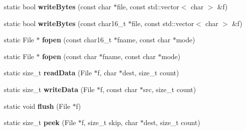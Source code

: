 \begin{DoxyCompactItemize}
\item 
\hypertarget{class_tempest_1_1_system_a_p_i_a67eec7d2f46346188cd33fa28ce6f58e}{static bool {\bfseries write\+Bytes} (const char $\ast$file, const std\+::vector$<$ char $>$ \&f)}\label{class_tempest_1_1_system_a_p_i_a67eec7d2f46346188cd33fa28ce6f58e}

\item 
\hypertarget{class_tempest_1_1_system_a_p_i_a15f47a03614f907f1b3bd8a5296af7d2}{static bool {\bfseries write\+Bytes} (const char16\+\_\+t $\ast$file, const std\+::vector$<$ char $>$ \&f)}\label{class_tempest_1_1_system_a_p_i_a15f47a03614f907f1b3bd8a5296af7d2}

\item 
\hypertarget{class_tempest_1_1_system_a_p_i_ab9aa33f6994e10db708417d124935c45}{static File $\ast$ {\bfseries fopen} (const char16\+\_\+t $\ast$fname, const char $\ast$mode)}\label{class_tempest_1_1_system_a_p_i_ab9aa33f6994e10db708417d124935c45}

\item 
\hypertarget{class_tempest_1_1_system_a_p_i_acce668a0f6bb48d2639d5726f4d12e5d}{static File $\ast$ {\bfseries fopen} (const char $\ast$fname, const char $\ast$mode)}\label{class_tempest_1_1_system_a_p_i_acce668a0f6bb48d2639d5726f4d12e5d}

\item 
\hypertarget{class_tempest_1_1_system_a_p_i_a4230f4d5fb605442a27b4d2ede77312e}{static size\+\_\+t {\bfseries read\+Data} (File $\ast$f, char $\ast$dest, size\+\_\+t count)}\label{class_tempest_1_1_system_a_p_i_a4230f4d5fb605442a27b4d2ede77312e}

\item 
\hypertarget{class_tempest_1_1_system_a_p_i_a9aae7541d4729af173139152756b7a29}{static size\+\_\+t {\bfseries write\+Data} (File $\ast$f, const char $\ast$src, size\+\_\+t count)}\label{class_tempest_1_1_system_a_p_i_a9aae7541d4729af173139152756b7a29}

\item 
\hypertarget{class_tempest_1_1_system_a_p_i_a9d81823b7d5c66ace6b5a16dc7b278a2}{static void {\bfseries flush} (File $\ast$f)}\label{class_tempest_1_1_system_a_p_i_a9d81823b7d5c66ace6b5a16dc7b278a2}

\item 
\hypertarget{class_tempest_1_1_system_a_p_i_a18f6e8af1cb2e6a7aa61d1bfac76bc41}{static size\+\_\+t {\bfseries peek} (File $\ast$f, size\+\_\+t skip, char $\ast$dest, size\+\_\+t count)}\label{class_tempest_1_1_system_a_p_i_a18f6e8af1cb2e6a7aa61d1bfac76bc41}


\end{DoxyCompactItemize}
